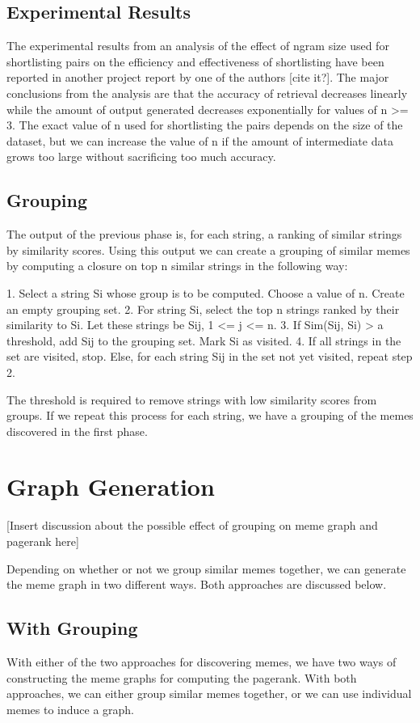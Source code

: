 \documentclass{acm_proc_article-sp}
\begin{document}
\subsection{Experimental Results}
The experimental results from an analysis of the effect of ngram size used for shortlisting pairs on the efficiency and effectiveness of shortlisting have been reported in another project report by one of the authors [cite it?]. The major conclusions from the analysis are that the accuracy of retrieval decreases linearly while the amount of output generated decreases exponentially for values of n >= 3. The exact value of n used for shortlisting the pairs depends on the size of the dataset, but we can increase the value of n if the amount of intermediate data grows too large without sacrificing too much accuracy.


\subsection{Grouping}
The output of the previous phase is, for each string, a ranking of similar strings by similarity scores. Using this output we can create a grouping of similar memes by computing a closure on top n similar strings in the following way:

1. Select a string Si whose group is to be computed. Choose a value of n. Create an empty grouping set.
2. For string Si, select the top n strings ranked by their similarity to Si. Let these strings be Sij, 1 <= j <= n. 
3. If Sim(Sij, Si) > a threshold, add Sij to the grouping set. Mark Si as visited.
4. If all strings in the set are visited, stop. Else, for each string Sij in the set not yet visited, repeat step 2.

The threshold is required to remove strings with low similarity scores from groups. If we repeat this process for each string, we have a grouping of the memes discovered in the first phase.

\section{Graph Generation}
[Insert discussion about the possible effect of grouping on meme graph and pagerank here]

Depending on whether or not we group similar memes together, we can generate the meme graph in two different ways. Both approaches are discussed below.

\subsection{With Grouping}
With either of the two approaches for discovering memes, we have two ways of constructing the meme graphs for computing the pagerank. With both approaches, we can either group similar memes together, or we can use individual memes to induce a graph.
\end{document}
